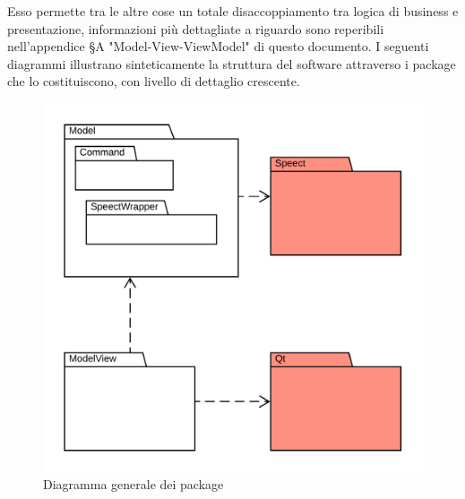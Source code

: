 \documentclass[openany,12pt,a4paper]{report}
\begin{document}
	\noindent Esso permette tra le altre cose un totale disaccoppiamento tra logica di business e presentazione, informazioni più dettagliate a riguardo sono reperibili nell'appendice §A "Model-View-ViewModel" di questo documento. I seguenti diagrammi illustrano sinteticamente la struttura del software attraverso i package che lo costituiscono, con livello di dettaglio crescente.
	
	\newpage
	
	\begin{figure}[H]
		\includegraphics[scale=1.4]{PackageDiagram1}
		\centering
		\caption{Diagramma generale dei package}
	\end{figure}
	
	\newpage
	
\end{document}
